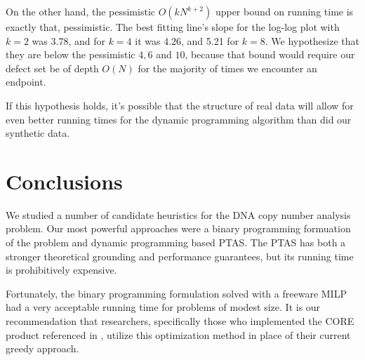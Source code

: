 \documentclass[11pt,twocolumn]{article}
\begin{document}
On the other hand, the pessimistic $O(kN^{k+2})$ upper bound on running time is exactly that, pessimistic. The best fitting line's slope for the log-log plot with $k=2$ was 3.78, and for $k=4$ it was 4.26, and 5.21 for $k=8$. We hypothesize that they are below the pessimistic $4, 6$ and $10$, because that bound would require our defect set be of depth $O(N)$ for the majority of times we encounter an endpoint. 

If this hypothesis holds, it's possible that the structure of real data will allow for even better running times for the dynamic programming algorithm than did our synthetic data.

\FloatBarrier
\section{Conclusions}

We studied a number of candidate heuristics for the DNA copy number analysis problem.  Our most powerful approaches were a binary programming formuation of the problem and dynamic programming based PTAS. The PTAS has both a stronger theoretical grounding and performance guarantees, but its running time is prohibitively expensive.

Fortunately, the binary programming formulation solved with a freeware MILP had a very acceptable running time for problems of modest size.  It is our recommendation that researchers, specifically those who implemented the CORE product referenced in \cite{krasnitz2013target}, utilize this optimization method in place of their current greedy approach.


{}
\end{document}
